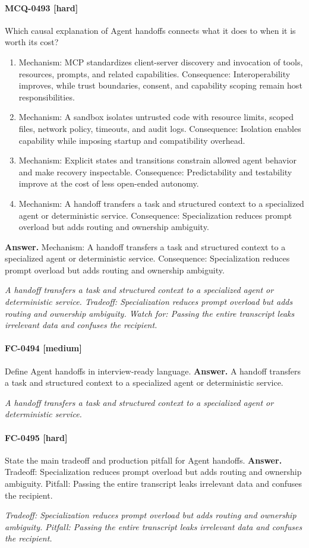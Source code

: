 \paragraph{MCQ-0493 [hard]} Which causal explanation of Agent handoffs connects what it does to when it is worth its cost?
\begin{enumerate}[label=\Alph*.]
\item Mechanism: MCP standardizes client-server discovery and invocation of tools, resources, prompts, and related capabilities. Consequence: Interoperability improves, while trust boundaries, consent, and capability scoping remain host responsibilities.
\item Mechanism: A sandbox isolates untrusted code with resource limits, scoped files, network policy, timeouts, and audit logs. Consequence: Isolation enables capability while imposing startup and compatibility overhead.
\item Mechanism: Explicit states and transitions constrain allowed agent behavior and make recovery inspectable. Consequence: Predictability and testability improve at the cost of less open-ended autonomy.
\item Mechanism: A handoff transfers a task and structured context to a specialized agent or deterministic service. Consequence: Specialization reduces prompt overload but adds routing and ownership ambiguity.
\end{enumerate}
\noindent\textbf{Answer.} Mechanism: A handoff transfers a task and structured context to a specialized agent or deterministic service. Consequence: Specialization reduces prompt overload but adds routing and ownership ambiguity.
\par\textit{A handoff transfers a task and structured context to a specialized agent or deterministic service. Tradeoff: Specialization reduces prompt overload but adds routing and ownership ambiguity. Watch for: Passing the entire transcript leaks irrelevant data and confuses the recipient.}
\paragraph{FC-0494 [medium]} Define Agent handoffs in interview-ready language.
\noindent\textbf{Answer.} A handoff transfers a task and structured context to a specialized agent or deterministic service.
\par\textit{A handoff transfers a task and structured context to a specialized agent or deterministic service.}
\paragraph{FC-0495 [hard]} State the main tradeoff and production pitfall for Agent handoffs.
\noindent\textbf{Answer.} Tradeoff: Specialization reduces prompt overload but adds routing and ownership ambiguity. Pitfall: Passing the entire transcript leaks irrelevant data and confuses the recipient.
\par\textit{Tradeoff: Specialization reduces prompt overload but adds routing and ownership ambiguity. Pitfall: Passing the entire transcript leaks irrelevant data and confuses the recipient.}
